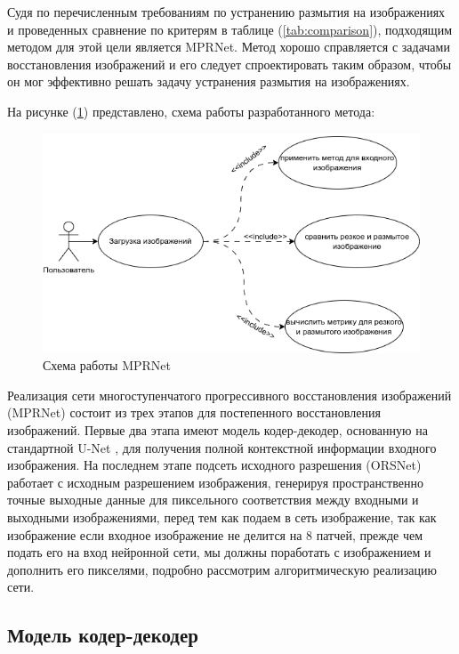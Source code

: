 Судя по перечисленным требованиям по устранению размытия на изображениях и проведенных сравнение по критерям в таблице (\ref{tab:comparison}), подходящим методом для этой цели является MPRNet. Метод хорошо справляется с задачами восстановления изображений и его следует спроектировать таким образом, чтобы он мог эффективно решать задачу устранения размытия на изображениях.

На рисунке (\ref{fig:mprnet-flowchart}) представлено, схема работы разработанного метода: 
\begin{figure}[H]
	\centering
	\includegraphics[width=0.5\linewidth]{assets/use-case-diagram.png}
	\caption{Схема работы MPRNet}
	\label{fig:mprnet-flowchart}
\end{figure}

Реализация сети многоступенчатого прогрессивного восстановления изображений (MPRNet) \cite{zamir2021multi} состоит из трех этапов для постепенного восстановления изображений. Первые два этапа имеют модель кодер-декодер, основанную на стандартной U-Net \cite{unet2015}, для получения полной контекстной информации входного изображения. На последнем этапе подсеть исходного разрешения (ORSNet) работает с исходным разрешением изображения, генерируя пространственно точные выходные данные для пиксельного соответствия между входными и выходными изображениями, перед тем как подаем в сеть изображение, так как изображение  если входное изображение не делится на 8 патчей, прежде чем подать его на вход нейронной сети, мы должны поработать с изображением и дополнить его пикселями, подробно рассмотрим алгоритмическую реализацию сети.



\subsection{Модель кодер-декодер}


